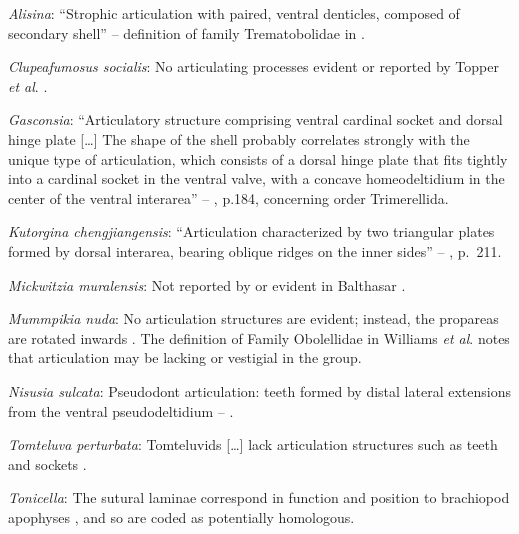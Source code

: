 \documentclass[openany]{book}
\theoremstyle{definition}
\theoremstyle{definition}
\theoremstyle{definition}
\theoremstyle{remark}
\begin{document}
\hypertarget{Alisina-coding-69}{}
\emph{Alisina}: ``Strophic articulation with paired, ventral denticles,
composed of secondary shell'' -- definition of family Trematobolidae in
\citet{Williams2000LinguliformeaCraniiformea}.

\hypertarget{Clupeafumosus_socialis-coding-69}{}
\emph{Clupeafumosus socialis}: No articulating processes evident or
reported by Topper \emph{et al}. \citeyearpar{Topper2013Reappraisalof}.

\hypertarget{Gasconsia-coding-69}{}
\emph{Gasconsia}: ``Articulatory structure comprising ventral cardinal
socket and dorsal hinge plate {[}\ldots{}{]} The shape of the shell
probably correlates strongly with the unique type of articulation, which
consists of a dorsal hinge plate that fits tightly into a cardinal
socket in the ventral valve, with a concave homeodeltidium in the center
of the ventral interarea'' --
\citet{Williams2000LinguliformeaCraniiformea}, p.184, concerning order
Trimerellida.

\hypertarget{Kutorgina_chengjiangensis-coding-69}{}
\emph{Kutorgina chengjiangensis}: ``Articulation characterized by two
triangular plates formed by dorsal interarea, bearing oblique ridges on
the inner sides'' -- \citet{Williams2000LinguliformeaCraniiformea},
p.~211.

\hypertarget{Mickwitzia_muralensis-coding-69}{}
\emph{Mickwitzia muralensis}: Not reported by or evident in Balthasar
\citeyearpar{Balthasar2004Shellstructure}.

\hypertarget{Mummpikia_nuda-coding-69}{}
\emph{Mummpikia nuda}: No articulation structures are evident; instead,
the propareas are rotated inwards \citep{Balthasar2008iMummpikia}. The
definition of Family Obolellidae in Williams \emph{et al}.
\citeyearpar{Williams2000LinguliformeaCraniiformea} notes that
articulation may be lacking or vestigial in the group.

\hypertarget{Nisusia_sulcata-coding-69}{}
\emph{Nisusia sulcata}: Pseudodont articulation: teeth formed by distal
lateral extensions from the ventral pseudodeltidium --
\citet{Holmer2018Evolutionarysignificance}.

\hypertarget{Tomteluva_perturbata-coding-69}{}
\emph{Tomteluva perturbata}: Tomteluvids {[}\ldots{}{]} lack
articulation structures such as teeth and sockets
\citep{Streng2016Anew}.

\hypertarget{Tonicella-coding-69}{}
\emph{Tonicella}: The sutural laminae correspond in function and
position to brachiopod apophyses \citep{Connors2012}, and so are coded
as potentially homologous.
\end{document}
